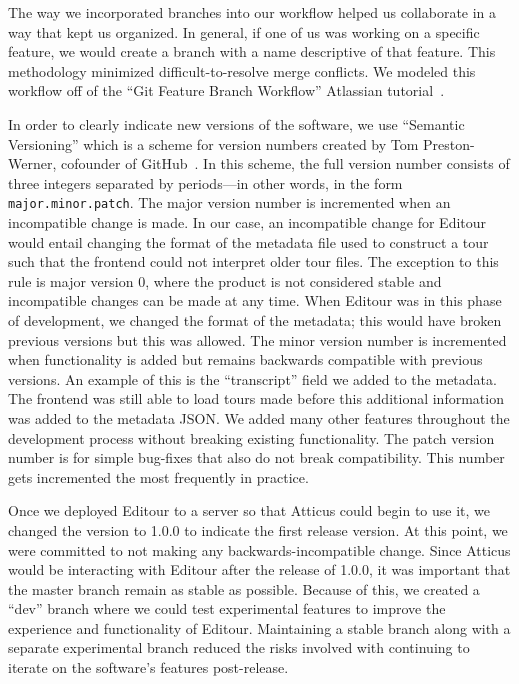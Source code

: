 \documentclass[a4paper, 10pt, american, titlepage]{article}
\begin{document}
The way we incorporated branches into our workflow helped us collaborate in a
way that kept us organized. In general, if one of us was working on a specific
feature, we would create a branch with a name descriptive of that feature. This
methodology minimized difficult-to-resolve merge conflicts. We modeled this
workflow off of the ``Git Feature Branch Workflow'' Atlassian
tutorial~\autocite{atlassian}.

In order to clearly indicate new versions of the software, we use ``Semantic
Versioning'' which is a scheme for version numbers created by Tom
Preston-Werner, cofounder of GitHub~\autocite{prestonwerner}. In this scheme,
the full version number consists of three integers separated by periods---in
other words, in the form \texttt{major.minor.patch}. The major version number is
incremented when an incompatible change is made. In our case, an incompatible
change for Editour would entail changing the format of the metadata file used to
construct a tour such that the frontend could not interpret older tour files.
The exception to this rule is major version 0, where the product is not
considered stable and incompatible changes can be made at any time. When Editour
was in this phase of development, we changed the format of the metadata; this
would have broken previous versions but this was allowed. The minor version
number is incremented when functionality is added but remains backwards
compatible with previous versions. An example of this is the ``transcript''
field we added to the metadata. The frontend was still able to load tours made
before this additional information was added to the metadata JSON. We added many
other features throughout the development process without breaking existing
functionality. The patch version number is for simple bug-fixes that also do not
break compatibility. This number gets incremented the most frequently in
practice.

Once we deployed Editour to a server so that Atticus could begin to use it, we
changed the version to 1.0.0 to indicate the first release version. At this
point, we were committed to not making any backwards-incompatible change. Since
Atticus would be interacting with Editour after the release of 1.0.0, it was
important that the master branch remain as stable as possible. Because of this,
we created a ``dev'' branch where we could test experimental features to improve
the experience and functionality of Editour. Maintaining a stable branch along
with a separate experimental branch reduced the risks involved with continuing
to iterate on the software's features post-release.
\end{document}
